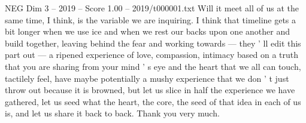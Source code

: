 \begin{textsample}{NEG Dim 3 – 2019 – Score 1.00 – 2019/t000001.txt}
Will it meet all of us at the same time, I think, is the variable we are inquiring.
I think that timeline gets a bit longer when we use ice and when we rest our backs upon one another and build together, leaving behind the fear and working towards — they ' ll edit this part out — a ripened experience of love, compassion, intimacy based on a truth that you are sharing from your mind ' s eye and the heart that we all can touch, tactilely feel, have maybe potentially a mushy experience that we don ' t just throw out because it is browned, but let us slice in half the experience we have gathered, let us seed what the heart, the core, the seed of that idea in each of us is, and let us share it back to back.
Thank you very much.

\end{textsample}
